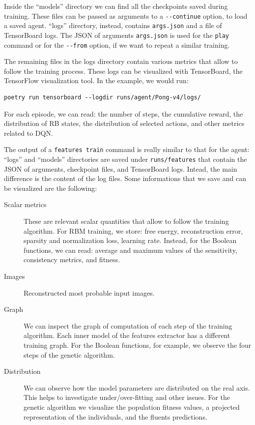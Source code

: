 Inside the ``models'' directory we can find all the checkpoints saved
during training. These files can be passed as arguments to a \verb|--continue|
option, to load a saved agent. ``logs'' directory, instead, contains
\verb|args.json| and a file of TensorBoard logs. The JSON of arguments
\verb|args.json| is used for the \texttt{play} command or for the
\verb|--from| option, if we want to repeat a similar training.

The remaining files in the logs directory contain various metrics that allow
to follow the training process. These logs can be visualized with TensorBoard,
the TensorFlow visualization tool. In the example, we would run:
\begin{lstlisting}[style=bash]
poetry run tensorboard --logdir runs/agent/Pong-v4/logs/
\end{lstlisting}
For each episode, we can read: the number of steps, the cumulative reward, the
distribution of RB states, the distribution of selected actions, and other
metrics related to DQN.

The output of a \texttt{features train} command is really similar to that for
the agent: ``logs'' and ``models'' directories are saved under
\verb|runs/features| that contain the JSON of arguments, checkpoint files, and
TensorBoard logs. Intead, the main difference is the content of the log files.
Some informations that we save and can be visualized are the following:
\begin{description}
	\item [Scalar metrics] These are relevant scalar quantities that allow to
		follow the training algorithm. For RBM training, we store: free energy,
		reconstruction error, sparsity and normalization loss, learning rate.
		Instead, for the Boolean functions, we can read: average and maximum
		values of the sensitivity, consistency metrics, and fitness.
	\item [Images] Reconstructed most probable input images.
	\item [Graph] We can inspect the graph of computation of each step of the
		training algorithm. Each inner model of the features extractor has a
		different training graph. For the Boolean functions, for example, we
		observe the four steps of the genetic algorithm.
	\item [Distribution] We can observe how the model parameters are distributed
		on the real axis. This helps to investigate under/over-fitting and other
		issues. For the genetic algorithm we visualize the population fitness
		values, a projected representation of the individuals, and the fluents
		predictions.
\end{description}


